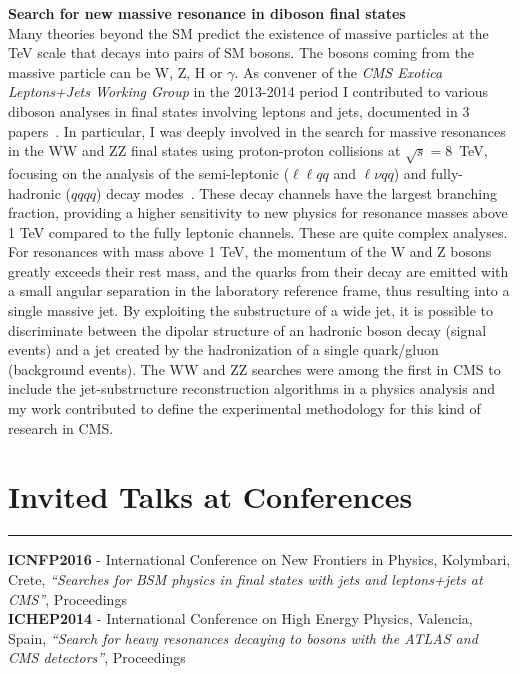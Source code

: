\documentclass[10pt, a4paper]{article}
\newcommand{\years}[1]{\marginnote{\hskip-0.2in{\small #1}}}
\begin{document}
{\bf Search for new massive resonance in diboson final states} \\[0.5em]
Many theories beyond the SM predict the existence of massive particles
at the TeV scale that decays into pairs of SM bosons. The bosons
coming from the massive particle can be W, Z, H or $\gamma$. 
As convener of the {\it CMS Exotica Leptons+Jets Working
Group} in the 2013-2014 period I contributed to various diboson
analyses in final states involving leptons and jets, documented in 
3 papers~\cite{Khachatryan:2016yji,Khachatryan:2015ywa,Khachatryan:2014gha}.
In particular, I was deeply involved in the search for massive resonances in the WW and ZZ 
final states using proton-proton collisions at $\sqrt{s}=8$~TeV, focusing
on the analysis of the semi-leptonic ($\ell\ell qq$ and $\ell\nu qq$) 
and fully-hadronic ($qqqq$) decay modes~\cite{Khachatryan:2014gha}.
These decay channels have the largest branching fraction, providing
a higher sensitivity to new physics for resonance masses above 1 TeV
compared to the fully leptonic channels.
These are quite complex analyses. For resonances with mass above 1 TeV, the momentum of the W and Z
bosons greatly exceeds their rest mass, and the quarks from their decay
are emitted with a small angular separation in the laboratory
reference frame, thus resulting into a single massive jet.  
By exploiting the substructure of a wide jet, it is possible to
discriminate between the dipolar structure of an hadronic boson decay (signal events)
and a jet created by the hadronization of a single quark/gluon (background events).
The WW and ZZ searches were among the first in CMS to include the
jet-substructure reconstruction algorithms in a physics analysis and
my work contributed to define the experimental
methodology for this kind of research in CMS.

\clearpage

\section*{Invited Talks at Conferences}
\vspace{-5pt}
\hrule
\vspace{10pt}
\years{07/2016}\textbf{ICNFP2016} - International Conference on New
Frontiers in Physics, Kolymbari, Crete, \textit{``Searches for BSM
  physics in ﬁnal states with jets and leptons+jets at CMS''},
Proceedings~\cite{Santanastasio:ICNFP2016} \\ [1em]
\years{07/2014}\textbf{ICHEP2014} - International Conference on High Energy Physics, Valencia, Spain, \textit{``Search for heavy resonances decaying to bosons with the ATLAS and CMS detectors''}, Proceedings~\cite{Santanastasio:ICHEP2014}
\end{document}
